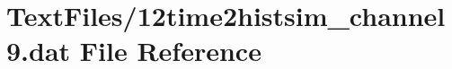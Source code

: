 \hypertarget{12time2histsim__channel9_8dat}{}\section{Text\+Files/12time2histsim\+\_\+channel9.dat File Reference}
\label{12time2histsim__channel9_8dat}

